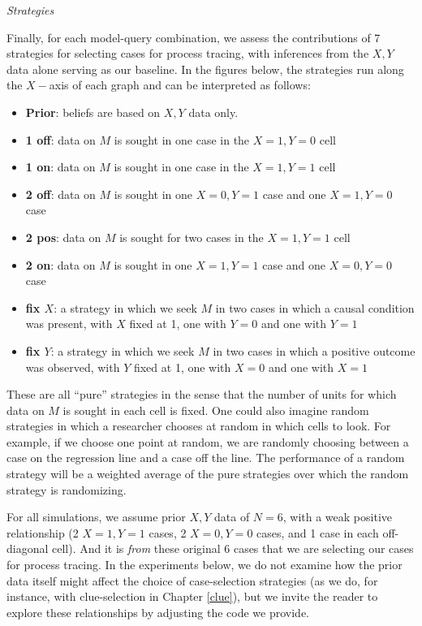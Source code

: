 \documentclass[
  12pt,
]{book}
\providecommand{\tightlist}{%
  \setlength{\itemsep}{0pt}\setlength{\parskip}{0pt}}
\begin{document}
\emph{Strategies}

Finally, for each model-query combination, we assess the contributions of 7 strategies for selecting cases for process tracing, with inferences from the \(X,Y\) data alone serving as our baseline. In the figures below, the strategies run along the \(X-\)axis of each graph and can be interpreted as follows:

\begin{itemize}
\tightlist
\item
  \textbf{Prior}: beliefs are based on \(X,Y\) data only.
\item
  \textbf{1 off}: data on \(M\) is sought in one case in the \(X=1, Y=0\) cell
\item
  \textbf{1 on}: data on \(M\) is sought in one case in the \(X=1, Y=1\) cell
\item
  \textbf{2 off}: data on \(M\) is sought in one \(X=0, Y=1\) case and one \(X=1, Y=0\) case
\item
  \textbf{2 pos}: data on \(M\) is sought for two cases in the \(X=1, Y=1\) cell
\item
  \textbf{2 on}: data on \(M\) is sought in one \(X=1, Y=1\) case and one \(X=0, Y=0\) case
\item
  \textbf{fix \(X\)}: a strategy in which we seek \(M\) in two cases in which a causal condition was present, with \(X\) fixed at 1, one with \(Y=0\) and one with \(Y=1\)
\item
  \textbf{fix \(Y\)}: a strategy in which we seek \(M\) in two cases in which a positive outcome was observed, with \(Y\) fixed at 1, one with \(X=0\) and one with \(X=1\)
\end{itemize}

These are all ``pure'' strategies in the sense that the number of units for which data on \(M\) is sought in each cell is fixed. One could also imagine random strategies in which a researcher chooses at random in which cells to look. For example, if we choose one point at random, we are randomly choosing between a case on the regression line and a case off the line. The performance of a random strategy will be a weighted average of the pure strategies over which the random strategy is randomizing.

For all simulations, we assume prior \(X,Y\) data of \(N=6\), with a weak positive relationship (2 \(X=1, Y=1\) cases, 2 \(X=0, Y=0\) cases, and 1 case in each off-diagonal cell). And it is \emph{from} these original 6 cases that we are selecting our cases for process tracing. In the experiments below, we do not examine how the prior data itself might affect the choice of case-selection strategies (as we do, for instance, with clue-selection in Chapter \ref{clue}), but we invite the reader to explore these relationships by adjusting the code we provide.
\end{document}
